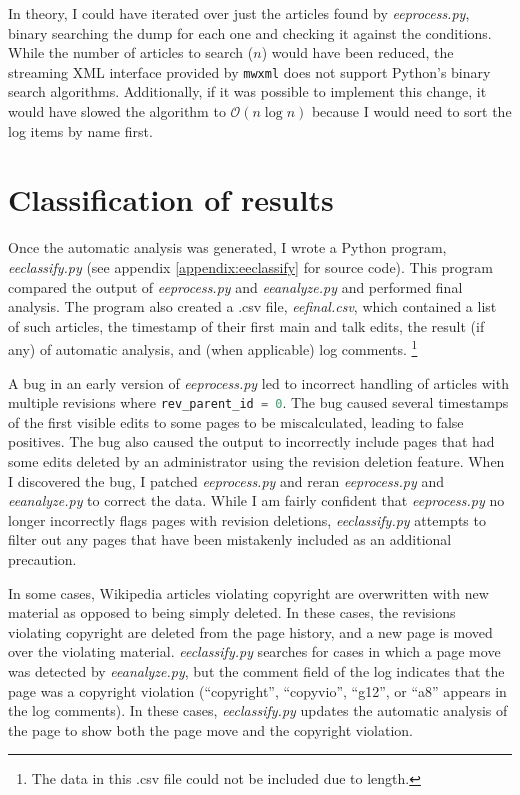 \documentclass[14pt,a4paper]{report}
\begin{document}
In theory, I could have iterated over just the articles found by \textit{eeprocess.py}, binary searching the dump for each one and checking it against the conditions. While the number of articles to search ($n$) would have been reduced, the streaming XML interface provided by \lstinline[language=python]{mwxml} does not support Python's binary search algorithms. Additionally, if it was possible to implement this change, it would have slowed the algorithm to $\mathcal{O}(n\log{n})$ because I would need to sort the log items by name first.

\chapter{Classification of results}
Once the automatic analysis was generated, I wrote a Python program, \textit{eeclassify.py} (see appendix \ref{appendix:eeclassify} for source code). This program compared the output of \textit{eeprocess.py} and \textit{eeanalyze.py} and performed final analysis. The program also created a .csv file, \textit{eefinal.csv}, which contained a list of such articles, the timestamp of their first main and talk edits, the result (if any) of automatic analysis, and (when applicable) log comments. \footnote{The data in this .csv file could not be included due to length.}

A bug in an early version of \textit{eeprocess.py} led to incorrect handling of articles with multiple revisions where \lstinline[language=sql]{rev_parent_id = 0}. The bug caused several timestamps of the first visible edits to some pages to be miscalculated, leading to false positives. The bug also caused the output to incorrectly include pages that had some edits deleted by an administrator using the revision deletion feature. When I discovered the bug, I patched \textit{eeprocess.py} and reran \textit{eeprocess.py} and \textit{eeanalyze.py} to correct the data. While I am fairly confident that \textit{eeprocess.py} no longer incorrectly flags pages with revision deletions, \textit{eeclassify.py} attempts to filter out any pages that have been mistakenly included as an additional precaution.

In some cases, Wikipedia articles violating copyright are overwritten with new material as opposed to being simply deleted. In these cases, the revisions violating copyright are deleted from the page history, and a new page is moved over the violating material. \textit{eeclassify.py} searches for cases in which a page move was detected by \textit{eeanalyze.py}, but the comment field of the log indicates that the page was a copyright violation (``copyright'', ``copyvio'', ``g12'', or ``a8'' appears in the log comments). In these cases, \textit{eeclassify.py} updates the automatic analysis of the page to show both the page move and the copyright violation.
\end{document}
